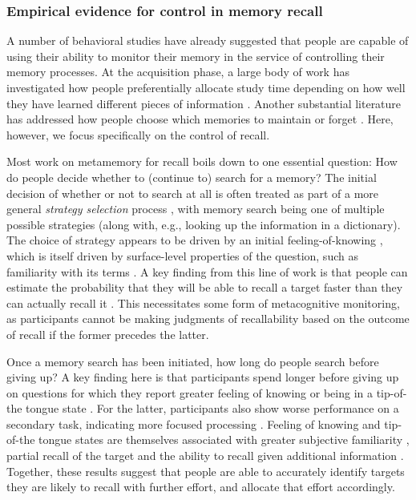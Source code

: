 \subsubsection{Empirical evidence for control in memory recall}

A number of behavioral studies have already suggested that people are capable of using their ability to monitor their memory in the service of controlling their memory processes. At the acquisition phase, a large body of work has investigated how people preferentially allocate study time depending on how well they have learned different pieces of information \citep{dunlosky1998training,metcalfe2009metacognitive,gureckis2012selfdirected}. Another substantial literature has addressed how people choose which memories to maintain or forget \citep{castel2007adaptive,williams2013benefit,suchow2016deciding,hu2019role}. Here, however, we focus specifically on the control of recall.

Most work on metamemory for recall boils down to one essential question: How do people decide whether to (continue to) search for a memory? The initial decision of whether or not to search at all is often treated as part of a more general \emph{strategy selection} process \citep{reder1988strategic}, with memory search being one of multiple possible strategies (along with, e.g., looking up the information in a dictionary). The choice of strategy appears to be driven by an initial feeling-of-knowing \citep{nhouyvanisvong1998rapid}, which is itself driven by surface-level properties of the question, such as familiarity with its terms \citep{reder1992determines}. A key finding from this line of work is that people can estimate the probability that they will be able to recall a target faster than they can actually recall it \citep{reder1987strategy}. This necessitates some form of metacognitive monitoring, as participants cannot be making judgments of recallability based on the outcome of recall if the former precedes the latter.

Once a memory search has been initiated, how long do people search before giving up? A key finding here is that participants spend longer before giving up on questions for which they report greater feeling of knowing \citep{nelson1984comparison,nhouyvanisvong1998rapid,gruneberg1977methodological,lachman1979metamemory} or being in a tip-of-the tongue state \citep{schwartz2001relation}. For the latter, participants also show worse performance on a secondary task, indicating more focused processing \citep{ryan1982motivated}. Feeling of knowing and tip-of-the tongue states are themselves associated with greater subjective familiarity \citep{reder1988strategic}, partial recall of the target \citep{brown1966tip,koriat1993how,schacter1985attribute} and the ability to recall given additional information \citep{gruneberg1974feeling}. Together, these results suggest that people are able to accurately identify targets they are likely to recall with further effort, and allocate that effort accordingly.

